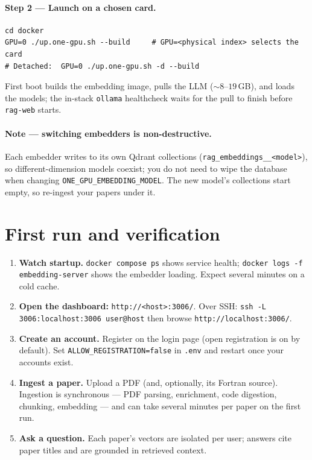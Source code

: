 \documentclass[11pt,a4paper]{article}
\newcommand{\code}[1]{\texttt{\small #1}}
\begin{document}
\paragraph{Step 2 --- Launch on a chosen card.}
\begin{lstlisting}
cd docker
GPU=0 ./up.one-gpu.sh --build     # GPU=<physical index> selects the card
# Detached:  GPU=0 ./up.one-gpu.sh -d --build
\end{lstlisting}
First boot builds the embedding image, pulls the LLM (${\sim}8$--$19$\,GB), and
loads the models; the in-stack \code{ollama} healthcheck waits for the pull to
finish before \code{rag-web} starts.

\paragraph{Note --- switching embedders is non-destructive.}
Each embedder writes to its own Qdrant collections
(\code{rag\_embeddings\_\_<model>}), so different-dimension models coexist; you
do not need to wipe the database when changing \code{ONE\_GPU\_EMBEDDING\_MODEL}.
The new model's collections start empty, so re-ingest your papers under it.

\section{First run and verification}\label{sec:firstrun}
\begin{enumerate}[leftmargin=1.5em,itemsep=3pt]
  \item \textbf{Watch startup.} \code{docker compose ps} shows service health;
        \code{docker logs -f embedding-server} shows the embedder loading.
        Expect several minutes on a cold cache.
  \item \textbf{Open the dashboard:} \code{http://<host>:3006/}. Over SSH:
        \code{ssh -L 3006:localhost:3006 user@host} then browse
        \code{http://localhost:3006/}.
  \item \textbf{Create an account.} Register on the login page (open
        registration is on by default). Set \code{ALLOW\_REGISTRATION=false} in
        \code{.env} and restart once your accounts exist.
  \item \textbf{Ingest a paper.} Upload a PDF (and, optionally, its Fortran
        source). Ingestion is synchronous --- PDF parsing, enrichment, code
        digestion, chunking, embedding --- and can take several minutes per
        paper on the first run.
  \item \textbf{Ask a question.} Each paper's vectors are isolated per user;
        answers cite paper titles and are grounded in retrieved context.
\end{enumerate}
\end{document}

